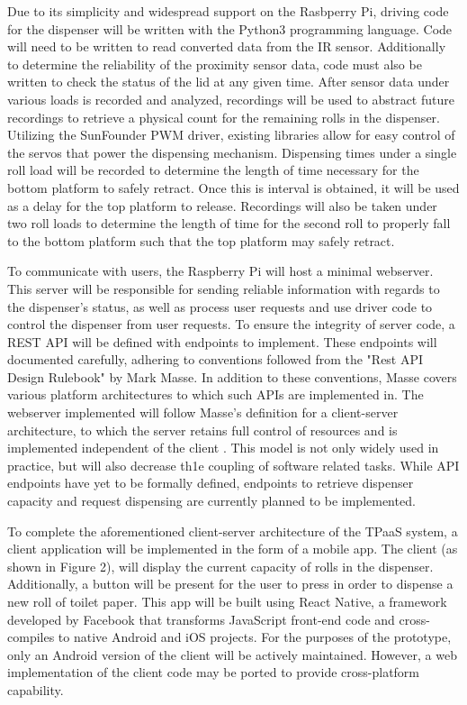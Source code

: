 \par Due to its simplicity and widespread support on the Rasbperry Pi, driving code for the dispenser will be written with the Python3 programming language. Code will need to be written to read converted data from the IR sensor. Additionally to determine the reliability of the proximity sensor data, code must also be written to check the status of the lid at any given time. After sensor data under various loads is recorded and analyzed, recordings will be used to abstract future recordings to retrieve a physical count for the remaining rolls in the dispenser. Utilizing the SunFounder PWM driver, existing libraries allow for easy control of the servos that power the dispensing mechanism. Dispensing times under a single roll load will be recorded to determine the length of time necessary for the bottom platform to safely retract. Once this is interval is obtained, it will be used as a delay for the top platform to release. Recordings will also be taken under two roll loads to determine the length of time for the second roll to properly fall to the bottom platform such that the top platform may safely retract.

\par To communicate with users, the Raspberry Pi will host a minimal webserver. This server will be responsible for sending reliable information with regards to the dispenser's status, as well as process user requests and use driver code to control the dispenser from user requests. To ensure the integrity of server code, a REST API will be defined with endpoints to implement. These endpoints will documented carefully, adhering to conventions followed from the "Rest API Design Rulebook" by Mark Masse. In addition to these conventions, Masse covers various platform architectures to which such APIs are implemented in. The webserver implemented will follow Masse's definition for a client-server architecture, to which the server retains full control of resources and is implemented independent of the client \cite{rest_api_rulebook}. This model is not only widely used in practice, but will also decrease th1e coupling of software related tasks. While API endpoints have yet to be formally defined, endpoints to retrieve dispenser capacity and request dispensing are currently planned to be implemented.

\par To complete the aforementioned client-server architecture of the TPaaS system, a client application will be implemented in the form of a mobile app. The client (as shown in Figure 2), will display the current capacity of rolls in the dispenser. Additionally, a button will be present for the user to press in order to dispense a new roll of toilet paper. This app will be built using React Native, a framework developed by Facebook that transforms JavaScript front-end code and cross-compiles to native Android and iOS projects. For the purposes of the prototype, only an Android version of the client will be actively maintained. However, a web implementation of the client code may be ported to provide cross-platform capability.

